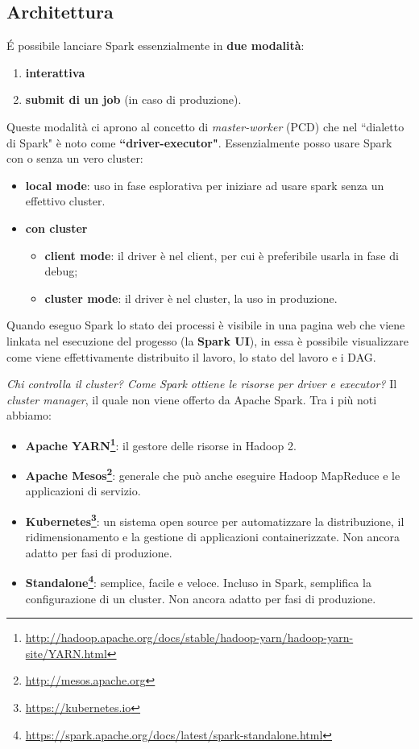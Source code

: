 \documentclass[12pt,italian]{article}
\begin{document}
\subsection{Architettura}
É possibile lanciare Spark essenzialmente in \textbf{due modalità}:
\begin{enumerate}
	\item \textbf{interattiva}
	\item \textbf{submit di un job} (in caso di produzione). 
\end{enumerate}
Queste modalità ci aprono al concetto di \textit{master-worker} (PCD) che nel ``dialetto di Spark" è noto come \textbf{``driver-executor"}.
Essenzialmente posso usare Spark con o senza un vero cluster:
\begin{itemize}
	\item \textbf{local mode}: uso in fase esplorativa per iniziare ad usare spark senza un effettivo cluster.
	\item \textbf{con cluster}
	\begin{itemize}
		\item \textbf{client mode}: il driver è nel client, per cui è preferibile usarla in fase di debug;
		\item \textbf{cluster mode}: il driver è nel cluster, la uso in produzione.
	\end{itemize}
\end{itemize}
Quando eseguo Spark lo stato dei processi è visibile in una pagina web che viene linkata nel esecuzione del progesso (la \textbf{Spark UI}), in essa è possibile visualizzare come viene effettivamente distribuito il lavoro, lo stato del lavoro e i DAG. %

\textit{Chi controlla il cluster? Come Spark ottiene le risorse per driver e executor?}
Il \textit{cluster manager}, il quale non viene offerto da Apache Spark. Tra i più noti abbiamo:
\begin{itemize}
	\item\textbf{Apache YARN\footnote{\url{http://hadoop.apache.org/docs/stable/hadoop-yarn/hadoop-yarn-site/YARN.html}}}: il gestore delle risorse in Hadoop 2.
	\item\textbf{Apache Mesos\footnote{\url{http://mesos.apache.org}}}: generale che può anche eseguire Hadoop MapReduce e le applicazioni di servizio.
	\item\textbf{Kubernetes\footnote{\url{https://kubernetes.io}}}: un sistema open source per automatizzare la distribuzione, il ridimensionamento e la gestione di applicazioni containerizzate. Non ancora adatto per fasi di produzione.
	\item\textbf{Standalone\footnote{\url{https://spark.apache.org/docs/latest/spark-standalone.html}}}: semplice, facile e veloce. Incluso in Spark, semplifica la configurazione di un cluster. Non ancora adatto per fasi di produzione. 
\end{itemize}
\end{document}
